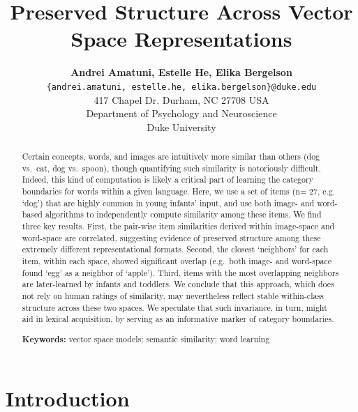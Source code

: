 \documentclass[10pt, letterpaper]{article}
\title{Preserved Structure Across Vector Space Representations}
\author{{\large \bf Andrei Amatuni, Estelle He, Elika Bergelson} \\ \texttt{\{andrei.amatuni, estelle.he, elika.bergelson\}@duke.edu} \\ 417 Chapel Dr. Durham, NC 27708 USA \\ Department of Psychology and Neuroscience \\ Duke University}
\begin{document}
\maketitle

\begin{abstract}
Certain concepts, words, and images are intuitively more similar than
others (dog vs.~cat, dog vs.~spoon), though quantifying such similarity
is notoriously difficult. Indeed, this kind of computation is likely a
critical part of learning the category boundaries for words within a
given language. Here, we use a set of items (n= 27, e.g. `dog') that are
highly common in young infants' input, and use both image- and
word-based algorithms to independently compute similarity among these
items. We find three key results. First, the pair-wise item similarities
derived within image-space and word-space are correlated, suggesting
evidence of preserved structure among these extremely different
representational formats. Second, the closest `neighbors' for each item,
within each space, showed significant overlap (e.g.~both image- and
word-space found `egg' as a neighbor of `apple'). Third, items with the
most overlapping neighbors are later-learned by infants and toddlers. We
conclude that this approach, which does not rely on human ratings of
similarity, may nevertheless reflect stable within-class structure
across these two spaces. We speculate that such invariance, in turn,
might aid in lexical acquisition, by serving as an informative marker of
category boundaries.

\textbf{Keywords:}
vector space models; semantic similarity; word learning
\end{abstract}

\section{Introduction}\label{introduction}
\end{document}

